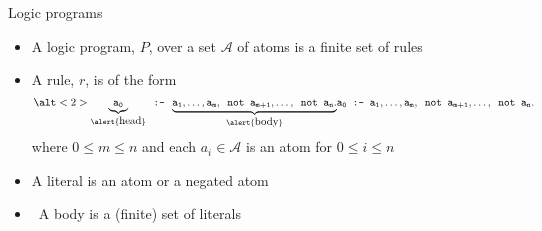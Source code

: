 \begin{frame}{Logic programs}
  \label{eqn:rule}
  \begin{itemize}
  \item <1->
    A \alert{logic program}, $P$, over a set $\mathcal{A}$ of atoms is a finite \alert{set} of rules
  \item <1->
    A \alert{rule}, $r$, is of the form
    \[
      \alt<2>{\underbrace{\tt a_0}_{\alert{\text{\normalsize head}}} \texttt{ :- } \underbrace{\tt a_1,\dots,a_m,\texttt{ not }{a_{m+1}},\dots,\texttt{ not }{a_n}.}_{\alert{\text{\normalsize body}}}}
             {\tt            a_0                               \texttt{ :- }                  a_1,\dots,a_m,\texttt{ not }{a_{m+1}},\dots,\texttt{ not }{a_n}.}
    \]
    where $0\leq m\leq n$ and each $a_i\in{\mathcal{A}}$ is an \alert{atom} for $0\leq i\leq n$
    \medskip
  \item <only@4-> A \alert{literal} is an atom or a negated atom
    \smallskip
  \item <only@5->  \ A body is a (finite) \alert{set} of literals
  \end{itemize}
\end{frame}
%
